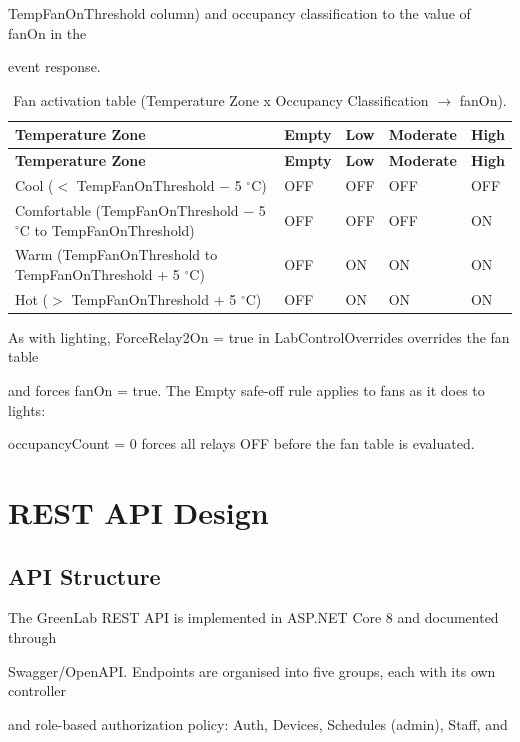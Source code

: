 TempFanOnThreshold column) and occupancy classification to the value of fanOn in the

event response.

\begin{longtable}{|L{3.4cm}|L{1.8cm}|L{1.8cm}|L{1.8cm}|L{1.8cm}|}
\caption{Fan activation table (Temperature Zone x Occupancy Classification $\rightarrow$ fanOn).} \label{tab:4-7} \\
\hline
{}
\textbf{Temperature Zone} & \textbf{Empty} & \textbf{Low} & \textbf{Moderate} & \textbf{High} \\
\hline
\endfirsthead
\hline
{}
\textbf{Temperature Zone} & \textbf{Empty} & \textbf{Low} & \textbf{Moderate} & \textbf{High} \\
\hline
\endhead
\hline
\endfoot
\hline
\endlastfoot
Cool ($<$ TempFanOnThreshold $-$ 5 $^{\circ}$C) & OFF & OFF & OFF & OFF \\
\hline
Comfortable (TempFanOnThreshold $-$ 5 $^{\circ}$C to TempFanOnThreshold) & OFF & OFF & OFF & ON \\
\hline
Warm (TempFanOnThreshold to TempFanOnThreshold $+$ 5 $^{\circ}$C) & OFF & ON & ON & ON \\
\hline
Hot ($>$ TempFanOnThreshold $+$ 5 $^{\circ}$C) & OFF & ON & ON & ON \\
\hline
\end{longtable}

As with lighting, ForceRelay2On = true in LabControlOverrides overrides the fan table

and forces fanOn = true. The Empty safe-off rule applies to fans as it does to lights:

occupancyCount = 0 forces all relays OFF before the fan table is evaluated.


\section{REST API Design}

\subsection{API Structure}
The GreenLab REST API is implemented in ASP.NET Core 8 and documented through

Swagger/OpenAPI. Endpoints are organised into five groups, each with its own controller

and role-based authorization policy: Auth, Devices, Schedules (admin), Staff, and

